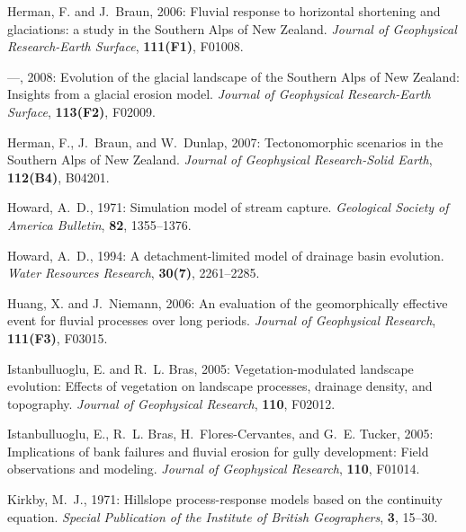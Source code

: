 \documentclass[12pt,reqno]{amsart}
\begin{document}
\begin{thebibliography}{41}
Herman, F. and J.~Braun, 2006: {Fluvial response to horizontal shortening and
  glaciations: a study in the Southern Alps of New Zealand}. {\em Journal of
  Geophysical Research-Earth Surface\/}, {\bf 111(F1)}, F01008.

---, 2008: {Evolution of the glacial landscape of the Southern Alps of New
  Zealand: Insights from a glacial erosion model}. {\em Journal of Geophysical
  Research-Earth Surface\/}, {\bf 113(F2)}, F02009.

Herman, F., J.~Braun, and W.~Dunlap, 2007: {Tectonomorphic scenarios in the
  Southern Alps of New Zealand}. {\em Journal of Geophysical Research-Solid
  Earth\/}, {\bf 112(B4)}, B04201.

Howard, A.~D., 1971: Simulation model of stream capture. {\em
  Geological Society of America Bulletin\/}, {\bf 82}, 1355--1376.

Howard, A.~D., 1994: A detachment-limited model of drainage basin evolution.
  {\em Water Resources Research\/}, {\bf 30(7)}, 2261--2285.

Huang, X. and J.~Niemann, 2006: {An evaluation of the geomorphically effective
  event for fluvial processes over long periods}. {\em Journal of Geophysical
  Research\/}, {\bf 111(F3)}, F03015.

Istanbulluoglu, E. and R.~L. Bras, 2005: Vegetation-modulated landscape
  evolution: Effects of vegetation on landscape processes, drainage density,
  and topography. {\em Journal of Geophysical Research\/}, {\bf 110}, F02012.

Istanbulluoglu, E., R.~L. Bras, H.~Flores-Cervantes, and G.~E. Tucker, 2005:
  Implications of bank failures and fluvial erosion for gully development:
  Field observations and modeling. {\em Journal of Geophysical Research\/},
  {\bf 110}, F01014.

Kirkby, M.~J., 1971: Hillslope process-response models based on the
  continuity equation. {\em Special Publication of the Institute of
  British Geographers}, {\bf 3}, 15--30.


\end{thebibliography}
\end{document}
